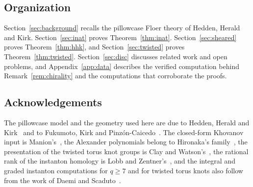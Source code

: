\subsection{Organization}
Section~\ref{sec:background} recalls the pillowcase Floer theory of Hedden, Herald and Kirk.
Section~\ref{sec:inat} proves Theorem~\ref{thm:inat}. Section~\ref{sec:sheared} proves Theorem~\ref{thm:hhk},
and Section~\ref{sec:twisted} proves Theorem~\ref{thm:twisted}. Section~\ref{sec:disc} discusses related work
and open problems, and Appendix~\ref{app:data} describes the verified computation behind
Remark~\ref{rem:chirality} and the computations that corroborate the proofs.

\subsection*{Acknowledgements}
The pillowcase model and the geometry used here are due to Hedden, Herald and Kirk~\cite{HHK1,HHK2} and to
Fukumoto, Kirk and Pinz\'on-Caicedo~\cite{FKP}. The closed-form Khovanov input is Manion's~\cite{Manion}, the Alexander polynomials belong to Hironaka's family~\cite{Hironaka}, the
presentation of the twisted torus knot groups is Clay and Watson's~\cite{ClayWatson}, the rational rank of
the instanton homology is Lobb and Zentner's~\cite{LZ}, and the integral and graded instanton computations
for $q\ge7$ and for twisted torus knots also follow from the work of Daemi and Scaduto~\cite{DS24}.
